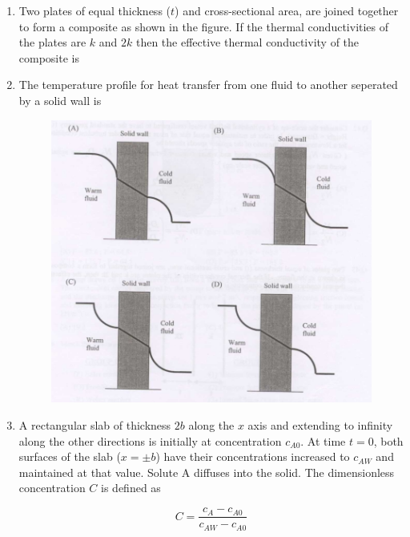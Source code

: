 \documentclass[journal,12pt,onecolumn]{IEEEtran}
\theoremstyle{remark}
\begin{document}
\begin{enumerate}
\item Two plates of equal thickness ($t$) and cross-sectional area, are joined together to form a composite as shown in the figure. If the thermal conductivities of the plates are $k$ and $2k$ then the effective thermal conductivity of the composite is
\hfill{}
\begin{enumerate}[label=(\Alph*)]
\end{enumerate}

\item The temperature profile for heat transfer from one fluid to another seperated by a solid wall is
\hfill{}
\begin{figure}[H]
    \centering
    \includegraphics[width=0.5\columnwidth]{figs/qn46.jpg}
    \caption{}
    \label{fig:qn46.jpg}
\end{figure}

\item A rectangular slab of thickness $2b$ along the $x$ axis and extending to infinity along the other directions is initially at concentration $c_{A0}$. At time $t=0$, both surfaces of the slab ($x = \pm b$) have their concentrations increased to $c_{AW}$ and maintained at that value. Solute A diffuses into the solid. The dimensionless concentration $C$ is defined as

\[C = \frac{c_A - c_{A0}}{c_{AW} - c_{A0}}\]


\end{enumerate}
\end{document}
